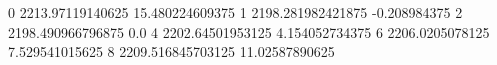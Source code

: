 0 2213.97119140625 15.480224609375
1 2198.281982421875 -0.208984375
2 2198.490966796875 0.0
4 2202.64501953125 4.154052734375
6 2206.0205078125 7.529541015625
8 2209.516845703125 11.02587890625
